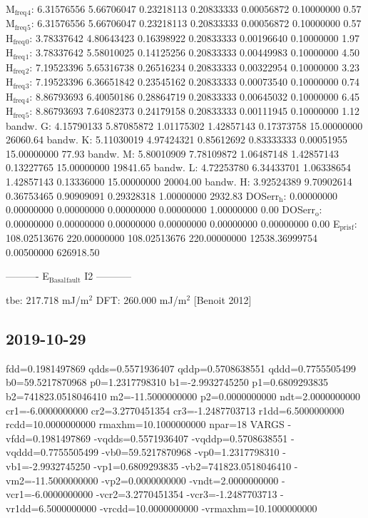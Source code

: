 \documentclass[11pt]{article}
\begin{document}
M\(_{\text{freq}}\)\(_{\text{4}}\):   6.31576556   5.66706047   0.23218113   0.20833333   0.00056872   0.10000000         0.57
M\(_{\text{freq}}\)\(_{\text{5}}\):   6.31576556   5.66706047   0.23218113   0.20833333   0.00056872   0.10000000         0.57
H\(_{\text{freq}}\)\(_{\text{0}}\):   3.78337642   4.80643423   0.16398922   0.20833333   0.00196640   0.10000000         1.97
H\(_{\text{freq}}\)\(_{\text{1}}\):   3.78337642   5.58010025   0.14125256   0.20833333   0.00449983   0.10000000         4.50
H\(_{\text{freq}}\)\(_{\text{2}}\):   7.19523396   5.65316738   0.26516234   0.20833333   0.00322954   0.10000000         3.23
H\(_{\text{freq}}\)\(_{\text{3}}\):   7.19523396   6.36651842   0.23545162   0.20833333   0.00073540   0.10000000         0.74
H\(_{\text{freq}}\)\(_{\text{4}}\):   8.86793693   6.40050186   0.28864719   0.20833333   0.00645032   0.10000000         6.45
H\(_{\text{freq}}\)\(_{\text{5}}\):   8.86793693   7.64082373   0.24179158   0.20833333   0.00111945   0.10000000         1.12
bandw. G:   4.15790133   5.87085872   1.01175302   1.42857143   0.17373758  15.00000000     26060.64
bandw. K:   5.11030019   4.97424321   0.85612692   0.83333333   0.00051955  15.00000000        77.93
bandw. M:   5.80010909   7.78109872   1.06487148   1.42857143   0.13227765  15.00000000     19841.65
bandw. L:   4.72253780   6.34433701   1.06338654   1.42857143   0.13336000  15.00000000     20004.00
bandw. H:   3.92524389   9.70902614   0.36753465   0.90909091   0.29328318   1.00000000      2932.83
DOSerr\(_{\text{h}}\):   0.00000000   0.00000000   0.00000000   0.00000000   0.00000000   1.00000000         0.00
DOSerr\(_{\text{o}}\):   0.00000000   0.00000000   0.00000000   0.00000000   0.00000000   0.00000000         0.00
E\(_{\text{pris}}\)\(_{\text{f}}\): 108.02513676 220.00000000 108.02513676 220.00000000 12538.36999754   0.00500000    626918.50

----------     E\(_{\text{Basal}}\)\(_{\text{fault}}\) I2     -----------

tbe:       217.718 mJ/m\(^{\text{2}}\)
DFT:       260.000 mJ/m\(^{\text{2}}\) [Benoit  2012]



\subsection{2019-10-29}
\label{sec:org9719d07}

  fdd=0.1981497869 qdds=0.5571936407 qddp=0.5708638551 qddd=0.7755505499 b0=59.5217870968 p0=1.2317798310 b1=-2.9932745250 p1=0.6809293835 b2=741823.0518046410 m2=-11.5000000000 p2=0.0000000000 ndt=2.0000000000 cr1=-6.0000000000 cr2=3.2770451354 cr3=-1.2487703713 r1dd=6.5000000000 rcdd=10.0000000000 rmaxhm=10.1000000000 npar=18 
VARGS
    -vfdd=0.1981497869 -vqdds=0.5571936407 -vqddp=0.5708638551 -vqddd=0.7755505499 -vb0=59.5217870968 -vp0=1.2317798310 -vb1=-2.9932745250 -vp1=0.6809293835 -vb2=741823.0518046410 -vm2=-11.5000000000 -vp2=0.0000000000 -vndt=2.0000000000 -vcr1=-6.0000000000 -vcr2=3.2770451354 -vcr3=-1.2487703713 -vr1dd=6.5000000000 -vrcdd=10.0000000000 -vrmaxhm=10.1000000000 
\end{document}

